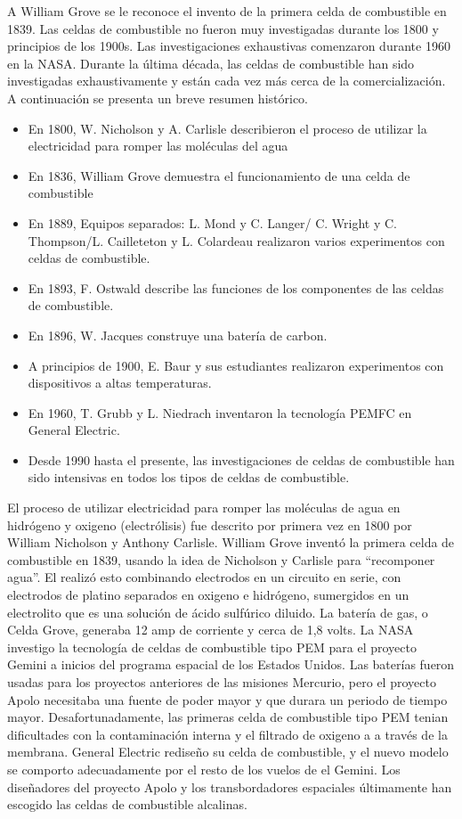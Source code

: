 \documentclass[12pt]{book}
\theoremstyle{definition}
\theoremstyle{remark}
\theoremstyle{plain}
\begin{document}
A William Grove se le reconoce el invento de la primera celda de combustible en 1839. Las celdas de combustible no fueron muy investigadas durante los 1800 y principios de 
los 1900s. 
Las investigaciones exhaustivas comenzaron durante 1960 en la NASA. 
Durante la última década, las celdas de combustible han sido investigadas exhaustivamente y están cada vez más cerca de la comercialización. 
A continuación se presenta un breve resumen histórico.

\begin{itemize}
 \item En 1800, W. Nicholson y A. Carlisle describieron el proceso de utilizar la electricidad para romper las moléculas del agua
 \item En  1836, William Grove demuestra el funcionamiento de una celda de combustible
 \item En 1889, Equipos separados: L. Mond y C. Langer/ C. Wright y C. Thompson/L. Cailleteton y L. Colardeau realizaron varios experimentos con celdas de combustible.
 \item En 1893, F. Ostwald describe las funciones de los componentes de las celdas de combustible.
 \item En 1896, W. Jacques construye una batería de carbon.
 \item A principios de 1900, E. Baur y sus estudiantes realizaron experimentos con dispositivos a altas temperaturas.
 \item En 1960, T. Grubb y L. Niedrach inventaron la tecnología PEMFC en General Electric.
 \item Desde 1990 hasta el presente, las investigaciones de celdas de combustible han sido intensivas en todos los tipos de celdas de combustible.
\end{itemize}

El proceso de utilizar electricidad para romper las moléculas de agua en hidrógeno y oxigeno
(electrólisis) fue descrito por primera vez en 1800 por William Nicholson y Anthony Carlisle. William
Grove inventó la primera celda de combustible en 1839, usando la idea de Nicholson y Carlisle
para ``recomponer agua''. El realizó esto combinando electrodos en un circuito en serie,
con electrodos de platino separados en oxigeno e hidrógeno, sumergidos en un electrolito que es 
una solución de ácido sulfúrico diluido. La batería de gas, o Celda Grove, generaba 12 amp de
corriente y cerca de 1,8 volts.
La NASA investigo la tecnología de celdas de combustible tipo PEM para el proyecto Gemini a inicios
del programa espacial de los Estados Unidos. Las baterías fueron usadas para los proyectos
anteriores de las misiones Mercurio, pero el proyecto Apolo necesitaba una fuente de poder
mayor y que durara un periodo de tiempo mayor. Desafortunadamente, las primeras celda de combustible
tipo PEM tenian dificultades con la contaminación interna y el filtrado de oxigeno a 
a través de la membrana. General Electric rediseño su celda de combustible, y el nuevo
modelo se comporto adecuadamente por el resto de los vuelos de el Gemini. Los diseñadores 
del proyecto Apolo y los transbordadores espaciales últimamente han escogido las celdas 
de combustible alcalinas.
\end{document}
